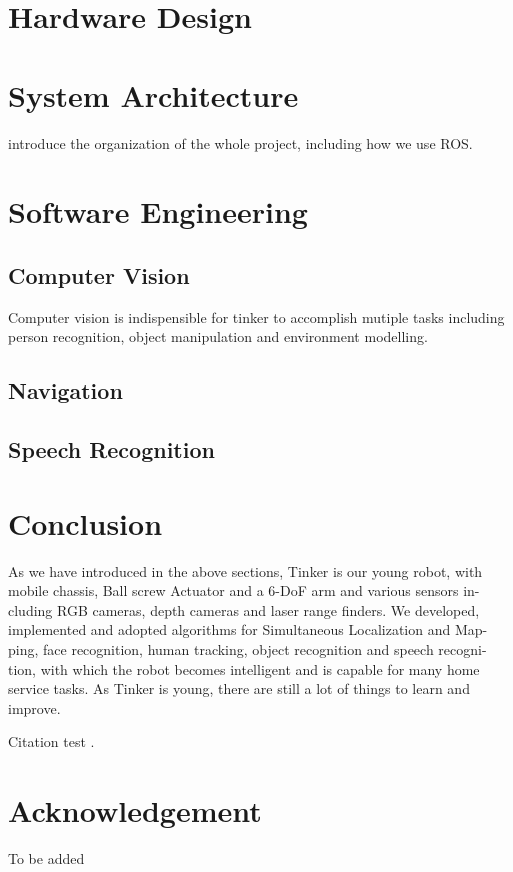 \documentclass[journal,12pt,onecolumn]{IEEEtran}
\begin{document}
\section{Hardware Design}




\section{System Architecture}

introduce the organization of the whole project, including how we use ROS.


\section{Software Engineering}
\subsection{Computer Vision}
Computer vision is indispensible for tinker to accomplish mutiple tasks including person recognition, object manipulation and environment modelling.


\subsection{Navigation}


\subsection{Speech Recognition}




\section{Conclusion}

As we have introduced in the above sections, Tinker is our young robot, with mobile chassis, Ball screw Actuator and a 6-DoF arm and various sensors in- cluding RGB cameras, depth cameras and laser range finders. We developed, implemented and adopted algorithms for Simultaneous Localization and Map- ping, face recognition, human tracking, object recognition and speech recogni- tion, with which the robot becomes intelligent and is capable for many home service tasks. As Tinker is young, there are still a lot of things to learn and improve.

Citation test \cite{xia2015human}.

\section*{Acknowledgement}
To be added



\end{document}
